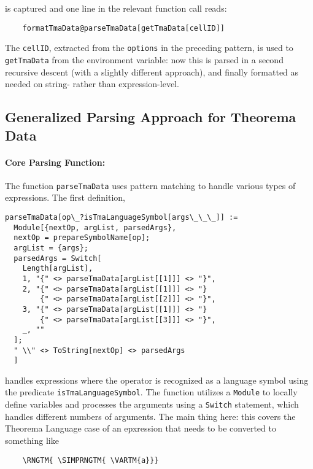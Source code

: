 is captured and one line in the relevant function call reads:

\begin{verbatim}
    formatTmaData@parseTmaData[getTmaData[cellID]]
\end{verbatim}

The \lstinline+cellID+, extracted from the \lstinline+options+ in the preceding pattern, is used to \lstinline+getTmaData+ from the environment variable: now this is parsed in a second recursive descent (with a slightly different approach), and finally formatted as needed on string- rather than expression-level.

\subsection{Generalized Parsing Approach for Theorema Data}

\paragraph{Core Parsing Function:}

The function \texttt{parseTmaData} uses pattern matching to handle various types of expressions. The first definition, 

\begin{verbatim}
parseTmaData[op\_?isTmaLanguageSymbol[args\_\_\_]] := 
  Module[{nextOp, argList, parsedArgs}, 
  nextOp = prepareSymbolName[op]; 
  argList = {args}; 
  parsedArgs = Switch[
    Length[argList], 
    1, "{" <> parseTmaData[argList[[1]]] <> "}", 
    2, "{" <> parseTmaData[argList[[1]]] <> "}
        {" <> parseTmaData[argList[[2]]] <> "}", 
    3, "{" <> parseTmaData[argList[[1]]] <> "}
        {" <> parseTmaData[argList[[3]]] <> "}", 
    _, ""
  ]; 
  " \\" <> ToString[nextOp] <> parsedArgs
  ]
\end{verbatim}

handles expressions where the operator is recognized as a language symbol using the predicate \texttt{isTmaLanguageSymbol}. The function utilizes a \texttt{Module} to locally define variables and processes the arguments using a \texttt{Switch} statement, which handles different numbers of arguments. The main thing here: this covers the Theorema Language case of an epxression that needs to be converted to something like

\begin{verbatim}
    \RNGTM{ \SIMPRNGTM{ \VARTM{a}}}
\end{verbatim}

